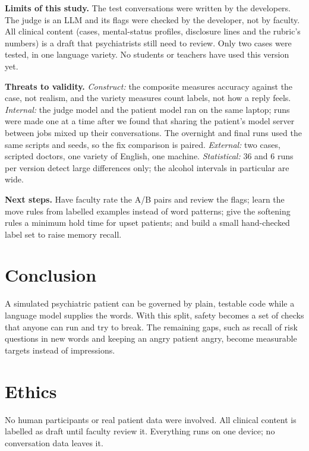 \documentclass[10pt]{article}
\begin{document}
\textbf{Limits of this study.} The test conversations were written by the developers. The judge is an LLM and its flags were checked by the
developer, not by faculty. All clinical content (cases, mental-status profiles, disclosure lines and the rubric's numbers) is a draft that
psychiatrists still need to review. Only two cases were tested, in one language variety. No students or teachers have used this version yet.

\textbf{Threats to validity.} \emph{Construct:} the composite measures accuracy against the case, not realism, and the variety measures
count labels, not how a reply feels. \emph{Internal:} the judge model and the patient model ran on the same laptop; runs were made one at a
time after we found that sharing the patient's model server between jobs mixed up their conversations. The overnight and final runs used the
same scripts and seeds, so the fix comparison is paired. \emph{External:} two cases, scripted doctors, one variety of English, one machine.
\emph{Statistical:} 36 and 6 runs per version detect large differences only; the alcohol intervals in particular are wide.

\textbf{Next steps.} Have faculty rate the A/B pairs and review the flags; learn the move rules from labelled examples instead of word patterns;
give the softening rules a minimum hold time for upset patients; and build a small hand-checked label set to raise memory recall.

\section{Conclusion}
A simulated psychiatric patient can be governed by plain, testable code while a language model supplies the words. With this split, safety becomes a set of checks that anyone can run and try to break. The remaining gaps, such as recall of risk questions in new words and keeping an angry patient angry, become measurable targets instead of impressions.

\section*{Ethics}
No human participants or real patient data were involved. All clinical content is labelled as draft until faculty review it. Everything runs on
one device; no conversation data leaves it.
\end{document}

